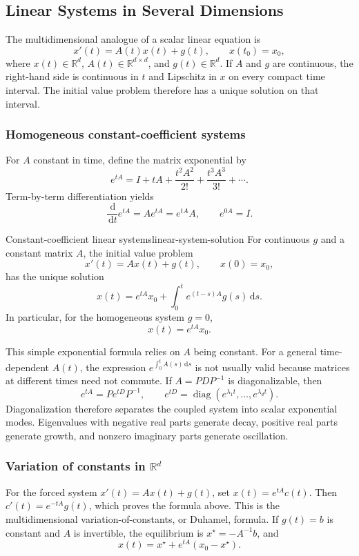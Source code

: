 \documentclass[11pt]{article}
\newcommand{\R}{\mathbb{R}}
\newcommand{\dd}{\,\mathrm{d}}
\theoremstyle{definition}
\theoremstyle{plain}
\theoremstyle{remark}
\begin{document}
\subsection{Linear Systems in Several Dimensions}

The multidimensional analogue of a scalar linear equation is
\[
\boxed{x'(t)=A(t)x(t)+g(t),\qquad x(t_0)=x_0,}
\]
where $x(t)\in\R^d$, $A(t)\in\R^{d\times d}$, and $g(t)\in\R^d$. If
$A$ and $g$ are continuous, the right-hand side is continuous in $t$ and
Lipschitz in $x$ on every compact time interval. The initial value problem
therefore has a unique solution on that interval.

\subsubsection*{Homogeneous constant-coefficient systems}

For $A$ constant in time, define the matrix exponential by
\[
\boxed{e^{tA}=I+tA+\frac{t^2A^2}{2!}+\frac{t^3A^3}{3!}+\cdots.}
\]
Term-by-term differentiation yields
\[
\frac{\dd}{\dd t}e^{tA}=Ae^{tA}=e^{tA}A,
\qquad e^{0A}=I.
\]
\begin{keyproposition}{Constant-coefficient linear systems}{linear-system-solution}
For continuous $g$ and a constant matrix $A$, the initial value problem
\[
x'(t)=Ax(t)+g(t),\qquad x(0)=x_0,
\]
has the unique solution
\[
\boxed{x(t)=e^{tA}x_0+\int_0^t e^{(t-s)A}g(s)\dd s.}
\]
In particular, for the homogeneous system $g=0$,
\[
\boxed{x(t)=e^{tA}x_0.}
\]
\end{keyproposition}

This simple exponential formula relies on $A$ being constant. For a general
time-dependent $A(t)$, the expression $e^{\int_0^tA(s)\dd s}$ is not usually
valid because matrices at different times need not commute.
If $A=PDP^{-1}$ is diagonalizable, then
\[
e^{tA}=Pe^{tD}P^{-1},
\qquad
e^{tD}=\operatorname{diag}(e^{\lambda_1t},\ldots,e^{\lambda_dt}).
\]
Diagonalization therefore separates the coupled system into scalar
exponential modes. Eigenvalues with negative real parts generate decay,
positive real parts generate growth, and nonzero imaginary parts generate
oscillation.

\subsubsection*{Variation of constants in $\R^d$}

For the forced system $x'(t)=Ax(t)+g(t)$, set $x(t)=e^{tA}c(t)$. Then
$c'(t)=e^{-tA}g(t)$, which proves the formula above.
This is the multidimensional variation-of-constants, or Duhamel, formula. If
$g(t)=b$ is constant and $A$ is invertible, the equilibrium is
$x^\star=-A^{-1}b$, and
\[
\boxed{x(t)=x^\star+e^{tA}(x_0-x^\star).}
\]
\end{document}
